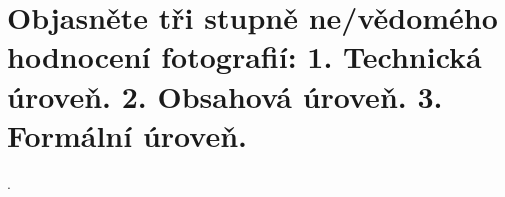 \section{Objasněte tři stupně ne/vědomého hodnocení fotografií: 1. Technická úroveň. 2. Obsahová úroveň. 3. Formální 
úroveň.}.